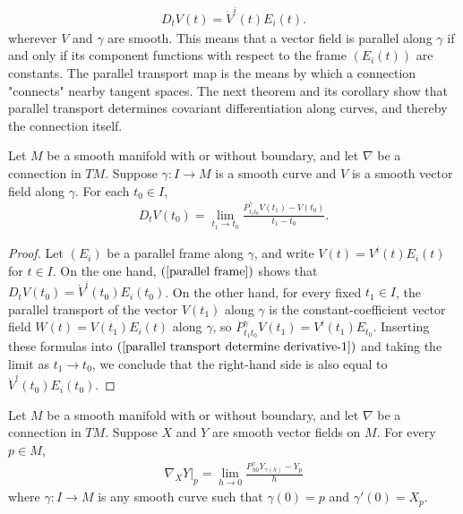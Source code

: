 \begin{align}\label{parallel frame}
D_tV(t)=\dot{V}^i(t)E_i(t).
\end{align}
wherever $V$ and $\gamma$ are smooth. This means that a vector field is parallel along $\gamma$ if and only if its component functions with respect to the frame $(E_i(t))$ 
are constants. The parallel transport map is the means by which a connection "connects" nearby tangent spaces. The next theorem and its corollary show that parallel 
transport determines covariant differentiation along curves, and thereby the connection itself.
\begin{theorem}\label{parallel transport determine derivative}
Let $M$ be a smooth manifold with or without boundary, and let $\nabla$ be a connection in $TM$. Suppose $\gamma:I\to M$ is a smooth curve and $V$ is a smooth vector 
field along $\gamma$. For each $t_0\in I$,
\begin{align}\label{parallel transport determine derivative-1}
D_tV(t_0)=\lim_{t_1\to t_0}\frac{P_{t_1t_0}^\gamma V(t_1)-V(t_0)}{t_1-t_0}.
\end{align}
\end{theorem}
\begin{proof}
Let $(E_i)$ be a parallel frame along $\gamma$, and write $V(t)=V^i(t)E_i(t)$ for $t\in I$. On the one hand, $(\ref{parallel frame})$ shows that 
$D_tV(t_0)=\dot{V}^i(t_0)E_i(t_0)$. On the other hand, for every fixed $t_1\in I$, the parallel transport of the vector $V(t_1)$ along $\gamma$ is the 
constant-coefficient vector field $W(t)=V(t_1)E_i(t)$ along $\gamma$, so $P_{t_1t_0}^\gamma V(t_1)=V^i(t_1)E_{t_0}$. Inserting these formulas into 
$(\ref{parallel transport determine derivative-1})$ and taking the limit as $t_1\to t_0$, we conclude that the right-hand side is also equal to $\dot{V}^i(t_0)E_i(t_0)$.
\end{proof}
\begin{corollary}\label{parallel transport determine connection}
Let $M$ be a smooth manifold with or without boundary, and let $\nabla$ be a connection in $TM$. Suppose $X$ and $Y$ are smooth vector fields on $M$. For every $p\in M$,
\begin{align}\label{parallel transport determine connection-1}
\nabla_XY|_p=\lim_{h\to 0}\frac{P_{h0}^{\gamma}Y_{\gamma(h)}-Y_p}{h}
\end{align}
where $\gamma:I\to M$ is any smooth curve such that $\gamma(0)=p$ and $\gamma'(0)=X_p$.
\end{corollary}
